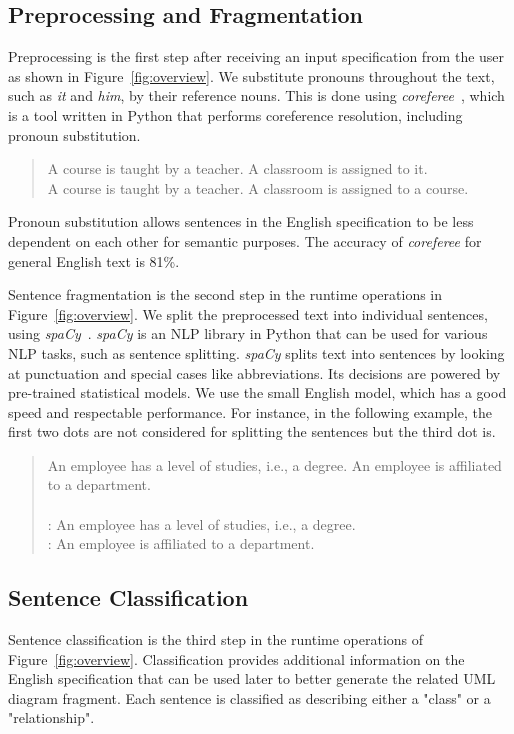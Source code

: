 \documentclass[sigconf]{acmart}
\begin{document}
\subsection{Preprocessing and Fragmentation}
Preprocessing is the first step after receiving an input specification from the user as shown in Figure~\ref{fig:overview}. We substitute pronouns throughout the text, such as \textit{it} and \textit{him}, by their reference nouns. This is done using \textit{coreferee}~\cite{coreferee}, which is a tool written in Python that performs coreference resolution, including pronoun substitution.

\begin{quote}
    A course is taught by a teacher. A classroom is assigned to it.\\
    
    A course is taught by a teacher. A classroom is assigned to a course.
\end{quote}



Pronoun substitution allows sentences in the English specification to be less dependent on each other for semantic purposes. The accuracy of \textit{coreferee} for general English text is 81\%.

Sentence fragmentation is the second step in the runtime operations in Figure~\ref{fig:overview}. We split the preprocessed text into individual sentences, using \textit{spaCy}~\cite{spacy}. \textit{spaCy} is an NLP library in Python that can be used for various NLP tasks, such as sentence splitting. \textit{spaCy} splits text into sentences by looking at punctuation and special cases like abbreviations. Its decisions are powered by pre-trained statistical models. We use the small English model, which has a good speed and respectable performance. For instance, in the following example, the first two dots are not considered for splitting the sentences but the third dot is.



\begin{quote}
    An employee has a level of studies, i.e., a degree. An employee is affiliated to a department.\\
    \\
    : An employee has a level of studies, i.e., a degree.\\
    : An employee is affiliated to a department.
\end{quote}

\subsection{Sentence Classification} \label{sec:classification}
Sentence classification is the third step in the runtime operations of Figure~\ref{fig:overview}. Classification provides additional information on the English specification that can be used later to better generate the related UML diagram fragment. Each sentence is classified as describing either a "class" or a "relationship".
\end{document}
